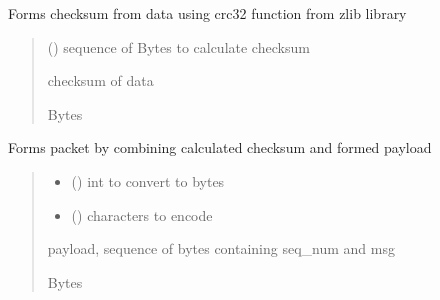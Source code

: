 \documentclass[letterpaper,10pt,oneside,english,openany]{sphinxmanual}
\begin{document}

\begin{fulllineitems}
\label{\detokenize{modules:receiver_rdt.make_checksum}}
\pysigstartsignatures
\pysiglinewithargsret
{}
{}
{}
\pysigstopsignatures
\sphinxAtStartPar
Forms checksum from data using crc32 function from zlib library
\begin{quote}\begin{description}
\sphinxAtStartPar
{} () \textendash{} sequence of Bytes to calculate checksum

\sphinxAtStartPar
checksum of data

\sphinxAtStartPar
Bytes

\end{description}\end{quote}

\end{fulllineitems}


\begin{fulllineitems}
\label{\detokenize{modules:receiver_rdt.make_packet}}
\pysigstartsignatures
\pysiglinewithargsret
{}
{\sphinxparamcomma {}}
{}
\pysigstopsignatures
\sphinxAtStartPar
Forms packet by combining calculated checksum and formed payload
\begin{quote}\begin{description}
\begin{itemize}
\item {} 
\sphinxAtStartPar
{} () \textendash{} int to convert to bytes

\item {} 
\sphinxAtStartPar
{} () \textendash{} characters to encode

\end{itemize}

\sphinxAtStartPar
payload, sequence of bytes containing seq\_num and msg

\sphinxAtStartPar
Bytes

\end{description}\end{quote}

\end{fulllineitems}
\end{document}

